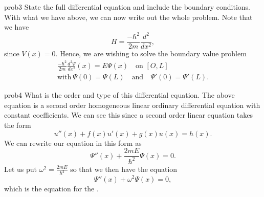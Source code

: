 \documentclass{article}
\begin{document}
\begin{solution}{}{prob3}
		State the full differential equation and include the boundary conditions.
		\tcblower
		With what we have above, we can now write out the whole problem. Note that we have
		\[
		H = \frac{-\hbar^2}{2m}\frac{d^2}{dx^2},
		\]
		since $V(x)=0$. Hence, we are wishing to solve the boundary value problem
		\begin{align*}
					\frac{-\hbar^2}{2m}\frac{d^2\Psi}{dx^2}(x)=E\Psi(x) \quad \textrm{on $[O,L]$}\\
					\textrm{with}~ \Psi(0)=\Psi(L) \quad \textrm{and}\quad \Psi'(0)=\Psi'(L). 
		\end{align*}
\end{solution}

\begin{solution}{}{prob4}
		What is the order and type of this differential equation.
		\tcblower
		The above equation is a second order homogeneous linear ordinary differential equation with constant coefficients.  We can see this since a second order linear equation takes the form
		\[
		u''(x)+f(x)u'(x)+g(x)u(x)=h(x).
		\]
		We can rewrite our equation in this form as
		\[
		\Psi''(x)+\frac{2mE}{\hbar^2}\Psi(x)=0.
		\]
		Let us put $\omega^2=\frac{2mE}{\hbar^2}$ so that we then have the equation
		\[
		\Psi''(x)+\omega^2\Psi(x)=0,
		\]
		which is the equation for the .
	\end{solution}
\end{document}
